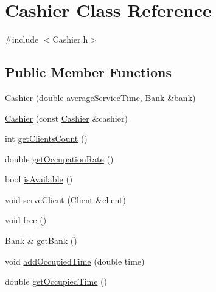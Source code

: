 \hypertarget{classCashier}{}\section{Cashier Class Reference}
\label{classCashier}


{\ttfamily \#include $<$Cashier.\+h$>$}

\subsection*{Public Member Functions}
\begin{DoxyCompactItemize}
\item 
\hyperlink{classCashier_a1616d49e92657698805bb9672df8c019}{Cashier} (double average\+Service\+Time, \hyperlink{classBank}{Bank} \&bank)
\item 
\hyperlink{classCashier_a1a4f6f058122e7c8d47eae5e64334ed6}{Cashier} (const \hyperlink{classCashier}{Cashier} \&cashier)
\item 
int \hyperlink{classCashier_a50d3d5779132b3806958d0e57aea7a34}{get\+Clients\+Count} ()
\item 
double \hyperlink{classCashier_ac0c91ebe2a9ca9428537e79b82bfbe9f}{get\+Occupation\+Rate} ()
\item 
bool \hyperlink{classCashier_a37d66e1a5f77c8f5cb8d77ef0b43e2e8}{is\+Available} ()
\item 
void \hyperlink{classCashier_a98be1361808932fb8a2fa4c294dcf09a}{serve\+Client} (\hyperlink{classClient}{Client} \&client)
\item 
void \hyperlink{classCashier_ac04b7595d1d7e51dd673590809cb5682}{free} ()
\item 
\hyperlink{classBank}{Bank} \& \hyperlink{classCashier_aa60d8270fa27302302b80a810c53a8f9}{get\+Bank} ()
\item 
void \hyperlink{classCashier_a571d08400e1d738163252caa61cbd165}{add\+Occupied\+Time} (double time)
\item 
double \hyperlink{classCashier_a1123f41f1643d9cce2e502243b2aa5b3}{get\+Occupied\+Time} ()
\end{DoxyCompactItemize}


